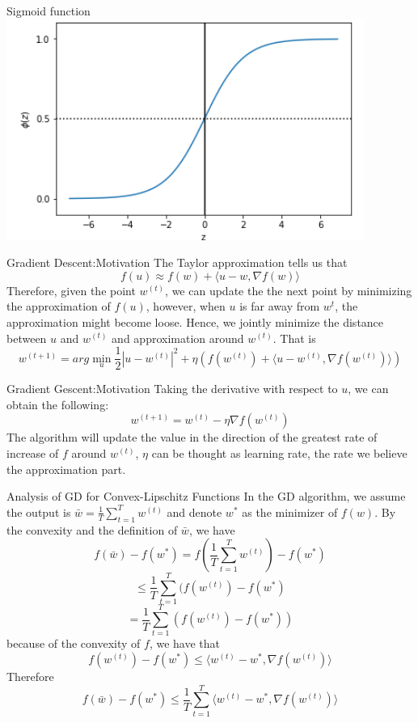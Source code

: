\documentclass{beamer}
\begin{document}
\begin{frame}
	 \begin{block}{Sigmoid function}
		 \includegraphics[width=\textwidth]{Sigmoid.png}
	\end{block}
\end{frame}
\begin{frame}{Gradient Descent:Motivation}
	The Taylor approximation tells us that 
	\[f(u) \approx f(w) + \langle u-w,\nabla f(w) \rangle \]
	Therefore, given the point $w^{(t)}$, we can update the the next point by minimizing the approximation of $f(u)$, however, when $u$ is far away from $w^{t}$, the approximation might become loose. Hence, we jointly minimize the distance between $u$ and $w^{(t)}$ and approximation around $w^{(t)}$. That is
	\[w^{(t+1)} = arg\min_{u} \frac{1}{2} |u-w^{(t)}|^2 + \eta(f(w^{(t)}) + \langle u - w^{(t)}, \nabla f(w^{(t)}) \rangle)\]
\end{frame}
\begin{frame}{Gradient Gescent:Motivation}
	Taking the derivative with respect to $u$, we can obtain the following:
	\[w^{(t+1)} = w^{(t)} - \eta \nabla f(w^{(t)})\]
	The algorithm will update the value in the direction of the greatest rate of increase of $f$ around $w^{(t)}$, $\eta $ can be thought as learning rate, the rate we believe the approximation part.
\end{frame}
\begin{frame}{Analysis of GD for Convex-Lipschitz Functions}
	In the GD algorithm, we assume the output is $\bar{w} = \frac{1}{T} \sum^T_{t=1} w^{(t)}$ and denote $w^*$ as the minimizer of $f(w)$. By the convexity and the definition of $\bar{w}$, we have 
\[f(\bar{w}) - f(w^*) = f(\frac{1}{T} \sum^T_{t=1} w^{(t)}) - f(w^*)\]
	\[	\leq \frac{1}{T} \sum^T_{t=1} (f(w^{(t)}) - f(w^*)\]
		\[= \frac{1}{T} \sum^T_{t=1} (f(w^{(t)}) - f(w^*)) \]
		because of the convexity of $f$, we have that 	
		\[f(w^{(t)}) - f(w^*) \leq \langle w^{(t)} - w^*, \nabla f(w^{(t)}) \rangle\]
Therefore
\[f(\bar{w}) - f(w^*) \leq \frac{1}{T} \sum^T_{t=1} \langle w^{(t)} - w^*, \nabla f(w^{(t)}) \rangle\]
\end{frame}
\end{document}
